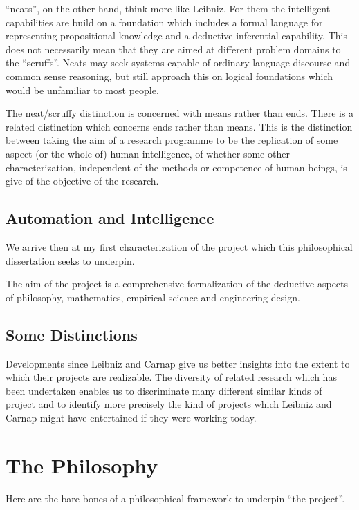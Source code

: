 ``neats'', on the other hand, think more like Leibniz.
For them the intelligent capabilities are build on a foundation which
includes a formal language for representing propositional knowledge
and a deductive inferential capability.
This does not necessarily mean that they are aimed at different
problem domains to the ``scruffs''.
Neats may seek systems capable of ordinary language discourse and
common sense reasoning, but still approach this on logical foundations
which would be unfamiliar to most people.

The neat/scruffy distinction is concerned with means rather than ends.
There is a related distinction which concerns ends rather than means.
This is the distinction between taking the aim of a research programme
to be the replication of some aspect (or the whole of) human
intelligence, of whether some other characterization, independent of
the methods or competence of human beings, is give of the objective of
the research.

\subsection{Automation and Intelligence}\label{AutomationAndIntelligence}

We arrive then at my first characterization of the project which this
philosophical dissertation seeks to underpin.

The aim of the project is a comprehensive formalization of the
deductive aspects of philosophy, mathematics, empirical science and
engineering design.

\subsection{Some Distinctions}

Developments since Leibniz and Carnap give us better insights into
the extent to which their projects are realizable.
The diversity of related research which has been undertaken enables us
to discriminate many different similar kinds of project and to
identify more precisely the kind of projects which Leibniz and Carnap
might have entertained if they were working today.

\section{The Philosophy}\label{ThePhilosophy}

Here are the bare bones of a philosophical framework to underpin ``the project''.

